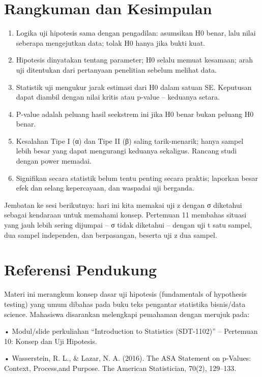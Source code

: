 \documentclass[
  indonesian,
  letterpaper,
]{book}
\begin{document}
\section{Rangkuman dan Kesimpulan}\label{rangkuman-dan-kesimpulan-1}

\begin{enumerate}
\def\labelenumi{\arabic{enumi}.}
\item
  Logika uji hipotesis sama dengan pengadilan: asumsikan H0 benar, lalu
  nilai seberapa mengejutkan data; tolak H0 hanya jika bukti kuat.
\item
  Hipotesis dinyatakan tentang parameter; H0 selalu memuat kesamaan;
  arah uji ditentukan dari pertanyaan penelitian sebelum melihat data.
\item
  Statistik uji mengukur jarak estimasi dari H0 dalam satuan SE.
  Keputusan dapat diambil dengan nilai kritis atau p-value -- keduanya
  setara.
\item
  P-value adalah peluang hasil seekstrem ini jika H0 benar bukan peluang
  H0 benar.
\item
  Kesalahan Tipe I (α) dan Tipe II (β) saling tarik-menarik; hanya
  sampel lebih besar yang dapat mengurangi keduanya sekaligus. Rancang
  studi dengan power memadai.
\item
  Signifikan secara statistik belum tentu penting secara praktis;
  laporkan besar efek dan selang kepercayaan, dan waspadai uji berganda.
\end{enumerate}

Jembatan ke sesi berikutnya: hari ini kita memakai uji z dengan σ
diketahui sebagai kendaraan untuk memahami konsep. Pertemuan 11 membahas
situasi yang jauh lebih sering dijumpai -- σ tidak diketahui -- dengan
uji t satu sampel, dua sampel independen, dan berpasangan, beserta uji z
dua sampel.

\section{Referensi Pendukung}\label{referensi-pendukung-1}

Materi ini merangkum konsep dasar uji hipotesis (fundamentals of
hypothesis testing) yang umum dibahas pada buku teks pengantar
statistika bisnis/data science. Mahasiswa disarankan melengkapi
pemahaman dengan merujuk pada:

• Modul/slide perkuliahan ``Introduction to Statistics (SDT-1102)'' --
Pertemuan 10: Konsep dan Uji Hipotesis.

• Wasserstein, R. L., \& Lazar, N. A. (2016). The ASA Statement on
p-Values: Context, Process,and Purpose. The American Statistician,
70(2), 129--133.
\end{document}
